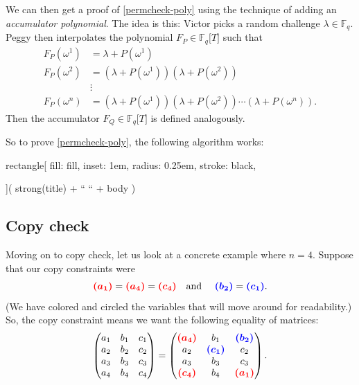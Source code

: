 \documentclass{article}
\newcommand{\redoval}[1]{\textcolor{red}{\boldsymbol{#1}}}
\newcommand{\bluerect}[1]{\textcolor{blue}{\boldsymbol{#1}}}
\begin{document}
We can then get a proof of
\hyperref[permcheck-poly]{{[}permcheck-poly{]}} using the technique of
adding an \emph{accumulator polynomial}. The idea is this: Victor picks
a random challenge \(\lambda \in {\mathbb{F}}_{q}\). Peggy then
interpolates the polynomial
\(F_{P} \in {\mathbb{F}}_{q}\lbrack T\rbrack\) such that
\[\begin{aligned}
F_{P}\left( \omega^{1} \right) & = \lambda + P\left( \omega^{1} \right) \\
F_{P}\left( \omega^{2} \right) & = \left( \lambda + P\left( \omega^{1} \right) \right)\left( \lambda + P\left( \omega^{2} \right) \right) \\
 & \vdots \\
F_{P}\left( \omega^{n} \right) & = \left( \lambda + P\left( \omega^{1} \right) \right)\left( \lambda + P\left( \omega^{2} \right) \right)\cdots\left( \lambda + P\left( \omega^{n} \right) \right).
\end{aligned}\] Then the accumulator
\(F_{Q} \in {\mathbb{F}}_{q}\lbrack T\rbrack\) is defined analogously.

So to prove \hyperref[permcheck-poly]{{[}permcheck-poly{]}}, the
following algorithm works:

rectangle{[} fill: fill, inset: 1em, radius: 0.25em, stroke: black,

{]}( strong(title) + `` `` + body )

\subsection{Copy check}

Moving on to copy check, let us look at a concrete example where
\(n = 4\). Suppose that our copy constraints were
\[ \redoval{(a_{1})} = 
\redoval{(a_{4})} = 
\redoval{(c_{4})}
\quad\text{and }\quad \bluerect{(b_{2})} = \bluerect{(c_{1})}.\]
(We have colored and circled the variables that will move around for
readability.) So, the copy constraint means we want the following
equality of matrices: \[\begin{pmatrix}
a_{1} & b_{1} & c_{1} \\
a_{2} & b_{2} & c_{2} \\
a_{3} & b_{3} & c_{3} \\
a_{4} & b_{4} & c_{4}
\end{pmatrix} = \begin{pmatrix}
\redoval{(a_{4})} & b_{1} & \bluerect{(b_{2})} \\
a_{2} & \bluerect{(c_{1})} & c_{2} \\
a_{3} & b_{3} & c_{3} \\
\redoval{(c_{4})} & b_{4} & \redoval{(a_{1})}
\end{pmatrix}.\] \label{copy1}{}
\end{document}
